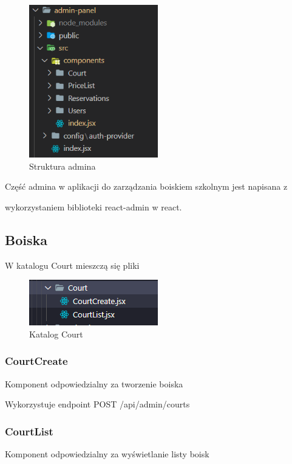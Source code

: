 \documentclass[titlepage]{article}
\begin{document}
\begin{figure}[h]
\centering
\includegraphics[width=0.5\textwidth]{struktura-admin.png}
\caption{Struktura admina}
\label{fig:obrazek struktura admina}
\end{figure}

\indent Część admina w aplikacji do zarządzania boiskiem szkolnym jest napisana z 

\newline
wykorzystaniem biblioteki react-admin w react.

\subsection{Boiska}
W katalogu Court mieszczą się pliki
\begin{figure}[h]
\centering
\includegraphics[width=0.5\textwidth]{court-admin.png}
\caption{Katalog Court}
\label{fig:obrazek Court}
\end{figure}
\subsubsection{CourtCreate}
Komponent odpowiedzialny za tworzenie boiska

\newline
Wykorzystuje endpoint POST /api/admin/courts
\subsubsection{CourtList}
Komponent odpowiedzialny za wyświetlanie listy boisk
\end{document}
